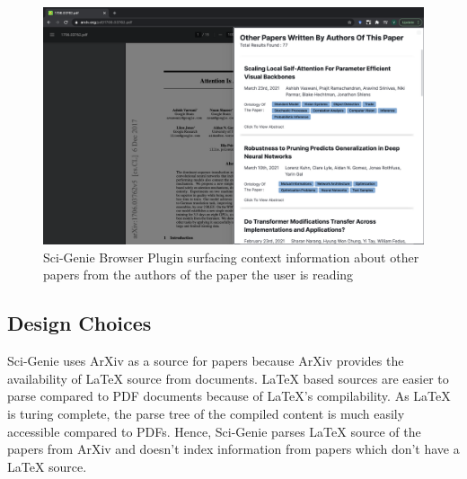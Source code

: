 \begin{figure}[h]
    \centering
    \includegraphics[width=\maxwidth{\textwidth}]{src/images/sci-genie-ext-authors-exp.png}
    \caption{ Sci-Genie Browser Plugin surfacing context information about other papers from the authors of the paper the user is reading}
    \label{figure\arabic{figurecounter}}
\end{figure}

\subsection{Design Choices}
Sci-Genie uses ArXiv as a source for papers because ArXiv provides the availability of LaTeX source from documents. LaTeX based sources are easier to parse compared to PDF documents because of LaTeX's compilability. As LaTeX is turing complete, the parse tree of the compiled content is much easily accessible compared to PDFs. Hence, Sci-Genie parses LaTeX source of the papers from ArXiv and doesn't index information from papers which don't have a LaTeX source. 
